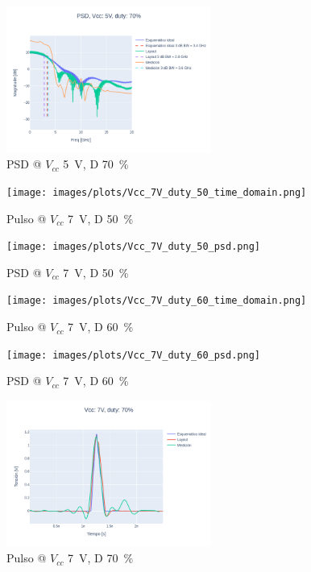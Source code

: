 \begin{figure}
  \centering
    \includegraphics[width=0.6\textwidth]{images/plots/Vcc_5V_duty_70_psd.png}
    \caption{PSD @ $V_{cc}$ \qty{5}{\volt}, D \qty{70}{\percent} }
    \label{fig:psd_5v_70}
\end{figure}

\begin{figure}
  \centering
    \texttt{[image: images/plots/Vcc\_7V\_duty\_50\_time\_domain.png]}
    \caption{Pulso @ $V_{cc}$ \qty{7}{\volt}, D \qty{50}{\percent} }
    \label{fig:plots_7v_50}
\end{figure}

\begin{figure}
  \centering
    \texttt{[image: images/plots/Vcc\_7V\_duty\_50\_psd.png]}
    \caption{PSD @ $V_{cc}$ \qty{7}{\volt}, D \qty{50}{\percent} }
    \label{fig:psd_7v_50}
\end{figure}

\begin{figure}
  \centering
    \texttt{[image: images/plots/Vcc\_7V\_duty\_60\_time\_domain.png]}
    \caption{Pulso @ $V_{cc}$ \qty{7}{\volt}, D \qty{60}{\percent} }
    \label{fig:plots_7v_60}
\end{figure}

\begin{figure}
  \centering
    \texttt{[image: images/plots/Vcc\_7V\_duty\_60\_psd.png]}
    \caption{PSD @ $V_{cc}$ \qty{7}{\volt}, D \qty{60}{\percent} }
    \label{fig:psd_7v_60}
\end{figure}

\begin{figure}
  \centering
    \includegraphics[width=0.6\textwidth]{images/plots/Vcc_7V_duty_70_time_domain.png}
    \caption{Pulso @ $V_{cc}$ \qty{7}{\volt}, D \qty{70}{\percent} }
    \label{fig:plots_7v_70}
\end{figure}

